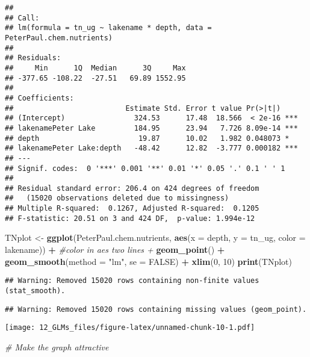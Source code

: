 \documentclass[]{article}
\newenvironment{Shaded}{\begin{snugshade}}{\end{snugshade}}
\newcommand{\KeywordTok}[1]{\textcolor[rgb]{0.13,0.29,0.53}{\textbf{#1}}}
\newcommand{\DataTypeTok}[1]{\textcolor[rgb]{0.13,0.29,0.53}{#1}}
\newcommand{\DecValTok}[1]{\textcolor[rgb]{0.00,0.00,0.81}{#1}}
\newcommand{\StringTok}[1]{\textcolor[rgb]{0.31,0.60,0.02}{#1}}
\newcommand{\CommentTok}[1]{\textcolor[rgb]{0.56,0.35,0.01}{\textit{#1}}}
\newcommand{\OtherTok}[1]{\textcolor[rgb]{0.56,0.35,0.01}{#1}}
\newcommand{\OperatorTok}[1]{\textcolor[rgb]{0.81,0.36,0.00}{\textbf{#1}}}
\newcommand{\NormalTok}[1]{#1}
\begin{document}
\begin{verbatim}
## 
## Call:
## lm(formula = tn_ug ~ lakename * depth, data = PeterPaul.chem.nutrients)
## 
## Residuals:
##     Min      1Q  Median      3Q     Max 
## -377.65 -108.22  -27.51   69.89 1552.95 
## 
## Coefficients:
##                          Estimate Std. Error t value Pr(>|t|)    
## (Intercept)                324.53      17.48  18.566  < 2e-16 ***
## lakenamePeter Lake         184.95      23.94   7.726 8.09e-14 ***
## depth                       19.87      10.02   1.982 0.048073 *  
## lakenamePeter Lake:depth   -48.42      12.82  -3.777 0.000182 ***
## ---
## Signif. codes:  0 '***' 0.001 '**' 0.01 '*' 0.05 '.' 0.1 ' ' 1
## 
## Residual standard error: 206.4 on 424 degrees of freedom
##   (15020 observations deleted due to missingness)
## Multiple R-squared:  0.1267, Adjusted R-squared:  0.1205 
## F-statistic: 20.51 on 3 and 424 DF,  p-value: 1.994e-12
\end{verbatim}

\begin{Shaded}
\begin{Highlighting}[]
\NormalTok{TNplot <-}\StringTok{ }\KeywordTok{ggplot}\NormalTok{(PeterPaul.chem.nutrients, }\KeywordTok{aes}\NormalTok{(}\DataTypeTok{x =}\NormalTok{ depth, }\DataTypeTok{y =}\NormalTok{ tn_ug, }\DataTypeTok{color =}\NormalTok{ lakename)) }\OperatorTok{+}\StringTok{ }\CommentTok{#color in aes two lines + }
\StringTok{  }\KeywordTok{geom_point}\NormalTok{() }\OperatorTok{+}\StringTok{ }
\StringTok{  }\KeywordTok{geom_smooth}\NormalTok{(}\DataTypeTok{method =} \StringTok{"lm"}\NormalTok{, }\DataTypeTok{se =} \OtherTok{FALSE}\NormalTok{) }\OperatorTok{+}
\StringTok{  }\KeywordTok{xlim}\NormalTok{(}\DecValTok{0}\NormalTok{, }\DecValTok{10}\NormalTok{)}
\KeywordTok{print}\NormalTok{(TNplot)}
\end{Highlighting}
\end{Shaded}

\begin{verbatim}
## Warning: Removed 15020 rows containing non-finite values (stat_smooth).
\end{verbatim}

\begin{verbatim}
## Warning: Removed 15020 rows containing missing values (geom_point).
\end{verbatim}

\texttt{[image: 12\_GLMs\_files/figure-latex/unnamed-chunk-10-1.pdf]}

\begin{Shaded}
\begin{Highlighting}[]
\CommentTok{# Make the graph attractive}
\end{Highlighting}
\end{Shaded}
\end{document}
